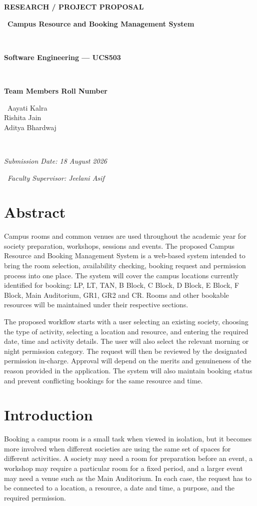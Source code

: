 \documentclass[12pt]{article}
\begin{document}
\begin{center}
    \textbf{\Large RESEARCH / PROJECT PROPOSAL}\

\
    \textbf{\Large Campus Resource and Booking Management System}\

\

    \textbf{Software Engineering --- UCS503}\

\

    \textbf{Team Members Roll Number}\

\
    Aayati Kalra \\
    Rishita Jain \\
    Aditya Bhardwaj \quad 1024030777\

\

    \textit{Submission Date: 18 August 2026}\

\
    \textit{Faculty Supervisor: Jeelani Asif}
\end{center}
\section{Abstract}
Campus rooms and common venues are used throughout the academic year for society preparation, workshops, sessions and events. The proposed Campus Resource and Booking Management System is a web-based system intended to bring the room selection, availability checking, booking request and permission process into one place. The system will cover the campus locations currently identified for booking: LP, LT, TAN, B Block, C Block, D Block, E Block, F Block, Main Auditorium, GR1, GR2 and CR. Rooms and other bookable resources will be maintained under their respective sections.

The proposed workflow starts with a user selecting an existing society, choosing the type of activity, selecting a location and resource, and entering the required date, time and activity details. The user will also select the relevant morning or night permission category. The request will then be reviewed by the designated permission in-charge. Approval will depend on the merits and genuineness of the reason provided in the application. The system will also maintain booking status and prevent conflicting bookings for the same resource and time.

\section{Introduction}
Booking a campus room is a small task when viewed in isolation, but it becomes more involved when different societies are using the same set of spaces for different activities. A society may need a room for preparation before an event, a workshop may require a particular room for a fixed period, and a larger event may need a venue such as the Main Auditorium. In each case, the request has to be connected to a location, a resource, a date and time, a purpose, and the required permission.
\end{document}
